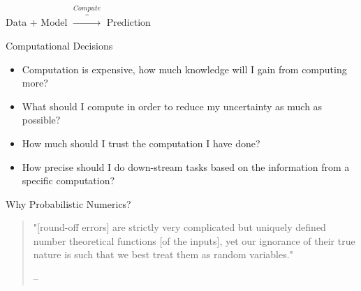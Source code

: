 \documentclass[]{beamer}
\begin{document}
\begin{frame}[label={sec:org5865480}]{}
\begin{center}
Data + Model \(\overbrace{\rightarrow}^{Compute}\) Prediction
\end{center}
\end{frame}
\begin{frame}[label={sec:orga6da087}]{Computational Decisions}
\begin{itemize}[<+->]
\item Computation is expensive, how much knowledge will I gain from computing more?
\item What should I compute in order to reduce my uncertainty as much as possible?
\item How much should I trust the computation I have done?
\item How precise should I do down-stream tasks based on the information from a specific computation?
\end{itemize}
\end{frame}
\begin{frame}[label={sec:orgac0817f}]{Why Probabilistic Numerics?}
\begin{quote} %
"[round-off errors] are strictly very complicated but uniquely defined number theoretical functions [of the inputs], yet our ignorance of their true nature is such that we best treat them as random variables."

-- \cite{neumann-1947-numer-inver}
\end{quote}
\end{frame}
\end{document}

